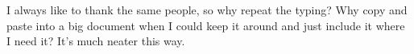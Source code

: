 I always like to thank the same people, so why repeat the typing? Why copy and 
paste into a big document when I could keep it around and just include it where 
I need it? It's much neater this way. 


